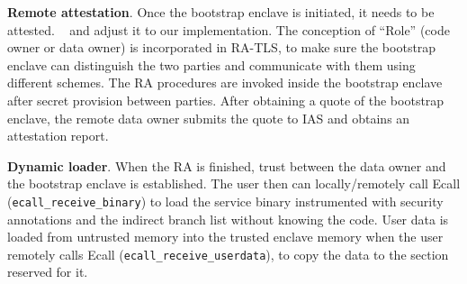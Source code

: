 


\vspace{3pt}\noindent\textbf{Remote attestation}.\label{subsec:ra-impl}
Once the bootstrap enclave is initiated, it needs to be attested. 
~\cite{knauth2018integrating} and adjust it to our implementation.
The conception of “Role” (code owner or data owner) is incorporated in RA-TLS, to make sure the bootstrap enclave can distinguish the two parties and communicate with them using different schemes.
The RA procedures are invoked inside the bootstrap enclave after secret provision between parties. After obtaining a quote of the bootstrap enclave, the remote data owner submits the quote to IAS and obtains an attestation report. 



\vspace{3pt}\noindent\textbf{Dynamic loader}. 
When the RA is finished, trust between the data owner and the bootstrap enclave is established. The user then can locally/remotely call Ecall (\verb|ecall_receive_binary|) to load the service binary instrumented with security annotations and the indirect branch list without knowing the code. 
User data is loaded from untrusted memory into the trusted enclave memory when the user remotely calls Ecall (\verb|ecall_receive_userdata|), to copy the data to the section reserved for it.

